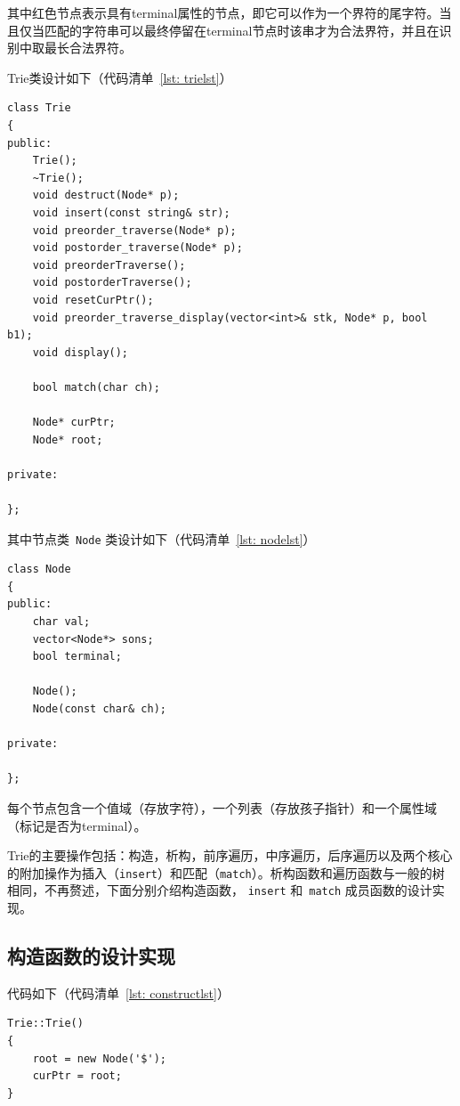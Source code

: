 \documentclass{article}
\begin{document}
\begin{CJK*}{UTF8}{gbsn}
其中红色节点表示具有terminal属性的节点，即它可以作为一个界符的尾字符。当且仅当匹配的字符串可以最终停留在terminal节点时该串才为合法界符，并且在识别中取最长合法界符。

Trie类设计如下（代码清单~\ref{lst: trielst}）

\begin{center}
\begin{lstlisting}[caption = {\texttt{Trie} 类代码清单}, label = {lst: trielst}]
class Trie
{
public:
	Trie();
	~Trie();
	void destruct(Node* p);
	void insert(const string& str);
	void preorder_traverse(Node* p);
	void postorder_traverse(Node* p);
	void preorderTraverse();
	void postorderTraverse();
	void resetCurPtr();
	void preorder_traverse_display(vector<int>& stk, Node* p, bool b1);
	void display();

	bool match(char ch);

	Node* curPtr;
	Node* root;

private:

};
\end{lstlisting}
\end{center}

其中节点类~\texttt{Node} 类设计如下（代码清单~\ref{lst: nodelst}）

\begin{center}
\begin{lstlisting}[caption = {\texttt{Node} 类代码清单}, label = {lst: nodelst}]
class Node
{
public:
	char val;
	vector<Node*> sons;
	bool terminal;

	Node();
	Node(const char& ch);

private:

};
\end{lstlisting}
\end{center}

每个节点包含一个值域（存放字符），一个列表（存放孩子指针）和一个属性域（标记是否为terminal）。

Trie的主要操作包括：构造，析构，前序遍历，中序遍历，后序遍历以及两个核心的附加操作为插入（\texttt{insert}）和匹配（\texttt{match}）。析构函数和遍历函数与一般的树相同，不再赘述，下面分别介绍构造函数， \texttt{insert} 和~\texttt{match} 成员函数的设计实现。

\subsection{构造函数的设计实现}
代码如下（代码清单~\ref{lst: constructlst}）
\begin{center}
\begin{lstlisting}[caption = {构造函数代码清单}, label = {lst: constructlst}]
Trie::Trie()
{
	root = new Node('$');
	curPtr = root;
}
\end{lstlisting}
\end{center}


\end{CJK*}
\end{document}
